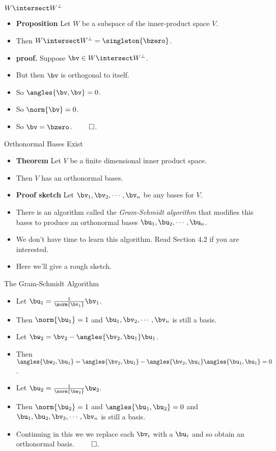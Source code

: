 \documentclass{beamer}
\begin{document}
\begin{frame}{$W\intersect W^{\perp}$}
\begin{itemize}
\item \textbf{Proposition} Let $W$ be a subspace of the inner-product space $V$.
\item Then $W\intersect W^{\perp} = \singleton{\bzero}$.
\item \textbf{proof.} Suppose $\bv\in W\intersect W^{\perp}$.
\item But then $\bv$ is orthogonal to itself.
\item So $\angles{\bv,\bv} = 0$.
\item So $\norm{\bv} = 0$.
\item So $\bv=\bzero$. $\qed$.
\end{itemize}
\end{frame}

\begin{frame}{Orthonormal Bases Exist}
\begin{itemize}
\item \textbf{Theorem} Let $V$ be a finite dimensional inner product space.
\item Then $V$ has an orthonormal bases.
\item \textbf{Proof sketch} Let $\bv_1,\bv_2,\cdots,\bv_n$ be any bases for $V$.
\item There is an algorithm called the \emph{Gram-Schmidt algorithm} that modifies
this bases to produce an orthonormal bases $\bu_1,\bu_2,\cdots,\bu_n$.
\item We don't have time to learn this algorithm. Read Section 4.2 if you are interested.
\item Here we'll give a rough sketch.
\end{itemize}
\end{frame}
\begin{frame}{The Gram-Schmidt Algorithm}
\begin{itemize}
\item Let $\bu_1 = \frac{1}{\norm{\bv_1}}\bv_1$.
\item Then $\norm{\bu_1} = 1$ and $\bu_1,\bv_2,\cdots,\bv_n$ is still a basis.
\item Let $\bw_2 = \bv_2 - \angles{\bv_2,\bu_1}\bu_1$.
\item Then $\angles{\bw_2,\bu_1} = \angles{\bv_2,\bu_1} - \angles{\bv_2,\bu_1}\angles{\bu_1,\bu_1} = 0$.
\item Let $\bu_2 = \frac{1}{\norm{\bw_2}}\bw_2$.
\item Then $\norm{\bu_2}=1$ and $\angles{\bu_1,\bu_2}=0$ and $\bu_1, \bu_2,\bv_3,\cdots,\bv_n$ is still a basis.
\item Continuing in this we we replace each $\bv_i$ with a $\bu_i$ and so obtain an orthonormal basis. $\qed$.
\end{itemize}
\end{frame}
\end{document}
